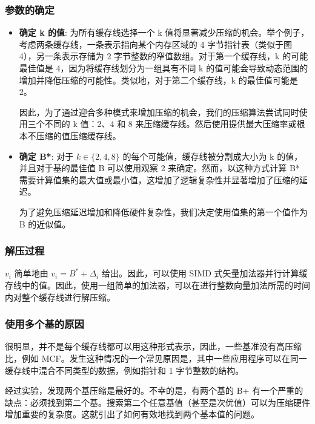 \documentclass[12pt]{article}
\begin{document}
\subsubsection{参数的确定}

\begin{itemize}
    \item \textbf{确定 k 的值}: 为所有缓存线选择一个 k 值将显著减少压缩的机会。举个例子，考虑两条缓存线，一条表示指向某个内存区域的 4 字节指针表（类似于图 4），另一条表示存储为 2 字节整数的窄值数组。对于第一个缓存线，k 的可能最佳值是 4，因为将缓存线划分为一组具有不同 k 的值可能会导致动态范围的增加并降低压缩的可能性。类似地，对于第二个缓存线，k 的最佳值可能是 2。
    
    因此，为了通过迎合多种模式来增加压缩的机会，我们的压缩算法尝试同时使用三个不同的 k 值：2、4 和 8 来压缩缓存线。然后使用提供最大压缩率或根本不压缩的值压缩缓存线。
    
    \item \textbf{确定 B*}: 对于 $k \in \{2, 4, 8\}$ 的每个可能值，缓存线被分割成大小为 k 的值，并且对于基的最佳值 B 可以使用观察 2 来确定。然而，以这种方式计算 B* 需要计算值集的最大值或最小值，这增加了逻辑复杂性并显著增加了压缩的延迟。
    
    为了避免压缩延迟增加和降低硬件复杂性，我们决定使用值集的第一个值作为 B 的近似值。
\end{itemize}

\subsubsection{解压过程}

$v_i$ 简单地由 $v_i = B^* + \Delta_i$ 给出。因此，可以使用 SIMD 式矢量加法器并行计算缓存线中的值。因此，使用一组简单的加法器，可以在进行整数向量加法所需的时间内对整个缓存线进行解压缩。

\subsubsection{使用多个基的原因}

很明显，并不是每个缓存线都可以用这种形式表示，因此，一些基准没有高压缩比，例如 MCF。发生这种情况的一个常见原因是，其中一些应用程序可以在同一缓存线中混合不同类型的数据，例如指针和 1 字节整数的结构。

经过实验，发现两个基压缩是最好的。不幸的是，有两个基的 B+ 有一个严重的缺点：必须找到第二个基。搜索第二个任意基值（甚至是次优值）可以为压缩硬件增加重要的复杂度。这就引出了如何有效地找到两个基本值的问题。
\end{document}

